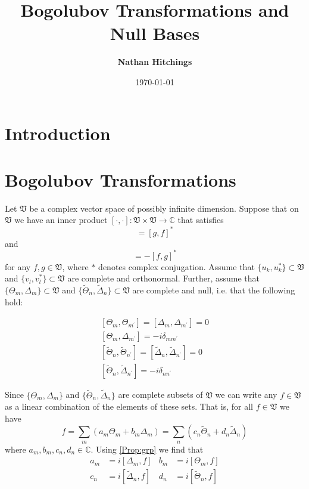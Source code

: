 \documentclass[letterpaper]{article}
\title{Bogolubov Transformations and Null Bases}
\date{\today}
\author{\textbf{Nathan Hitchings}}
\newcommand{\iip}[2]{\ensuremath{\left[#1,#2\right]}}
\newcommand{\DeltaT}{\ensuremath{\tilde{\Delta}}}
\newcommand{\ThetaT}{\ensuremath{\tilde{\Theta}}}
\begin{document}
\maketitle
\section{Introduction}
\section{Bogolubov Transformations}
Let $\mathfrak{V}$ be a complex vector space of possibly infinite
dimension. Suppose that on $\mathfrak{V}$ we have an inner product
$\iip{\cdot}{\cdot}:\mathfrak{V}\times\mathfrak{V}\to\mathbb{C}$ that
satisfies
\begin{equation}
  [f,g]=[g,f]^*
\end{equation}
and
\begin{equation}
  [f^*,g^*]=-[f,g]^*
\end{equation}
for any $f,g\in\mathfrak{V}$, where $*$ denotes complex
conjugation. Assume that 
$\{u_k,u_k^*\}\subset\mathfrak{V}$ and
$\{v_l,v_l^*\}\subset\mathfrak{V}$ are complete and
orthonormal. Further, assume that
$\{\Theta_m,\Delta_m\}\subset\mathfrak{V}$
and
$\{\tilde{\Theta}_n,\tilde{\Delta}_n\}\subset\mathfrak{V}$
are complete and null, i.e. that the following hold:

\begin{subequations}\label{Prop:grp}
\begin{gather}
  \iip{\Theta_m}{\Theta_{m^{\prime}}}=\iip{\Delta_m}{\Delta_{m^{\prime}}}=0\\
  \iip{\Theta_m}{\Delta_{m^\prime}}=-i\delta_{mm^\prime}\\
  \iip{\ThetaT_n}{\ThetaT_{n^{\prime}}}=\iip{\DeltaT_n}{\DeltaT_{n^{\prime}}}=0\\
  \iip{\ThetaT_n}{\DeltaT_{n^\prime}}=-i\delta_{nn^\prime}
\end{gather}
\end{subequations}

Since $\{\Theta_m,\Delta_m\}$ and
$\{\tilde{\Theta}_n,\tilde{\Delta}_n\}$ are
complete subsets of $\mathfrak{V}$ we can write any
$f\in\mathfrak{V}$ as a linear combination of the elements of these
sets. That is, for all $f\in\mathfrak{V}$ we have 
\begin{equation}
  f=\sum_m(a_m\Theta_m+b_m\Delta_m)=\sum_n(c_n\tilde{\Theta}_n+d_n\tilde{\Delta}_n)
\end{equation}
 where $a_m,b_m,c_n,d_n\in\mathbb{C}$. Using \eqref{Prop:grp} we find
 that
 \begin{align}
   a_m&=i[\Delta_m,f]&b_m&=i[\Theta_m,f]\\
   c_n&=i[\DeltaT_n,f]&d_n&=i[\ThetaT_n,f]
 \end{align}
\end{document}
